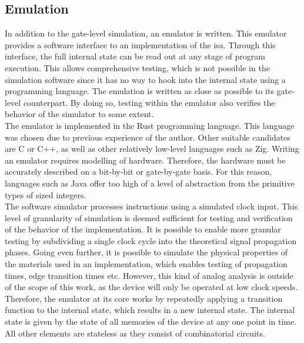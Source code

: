 \subsection{Emulation} \label{sec:software_emulation}

In addition to the gate-level simulation, an emulator is written. This emulator provides a software interface to an implementation of the \ac{isa}. Through this interface, the full internal state can be read out at any stage of program execution. This allows comprehensive testing, which is not possible in the simulation software since it has no way to hook into the internal state using a programming language. The emulation is written as close as possible to its gate-level counterpart. By doing so, testing within the emulator also verifies the behavior of the simulator to some extent. \\

The emulator is implemented in the Rust programming language. This language was chosen due to previous experience of the author. Other suitable candidates are C or C++, as well as other relatively low-level languages such as Zig. Writing an emulator requires modelling of hardware. Therefore, the hardware must be accurately described on a bit-by-bit or gate-by-gate basis. For this reason, languages such as Java offer too high of a level of abstraction from the primitive types of sized integers. \\

The software simulator processes instructions using a simulated clock input. This level of granularity of simulation is deemed sufficient for testing and verification of the behavior of the implementation. It is possible to enable more granular testing by subdividing a single clock cycle into the theoretical signal propagation phases. Going even further, it is possible to simulate the physical properties of the materials used in an implementation, which enables testing of propagation times, edge transition times etc. However, this kind of analog analysis is outside of the scope of this work, as the device will only be operated at low clock speeds. Therefore, the emulator at its core works by repeatedly applying a transition function to the internal state, which results in a new internal state. The internal state is given by the state of all memories of the device at any one point in time. All other elements are stateless as they consist of combinatorial circuits.

